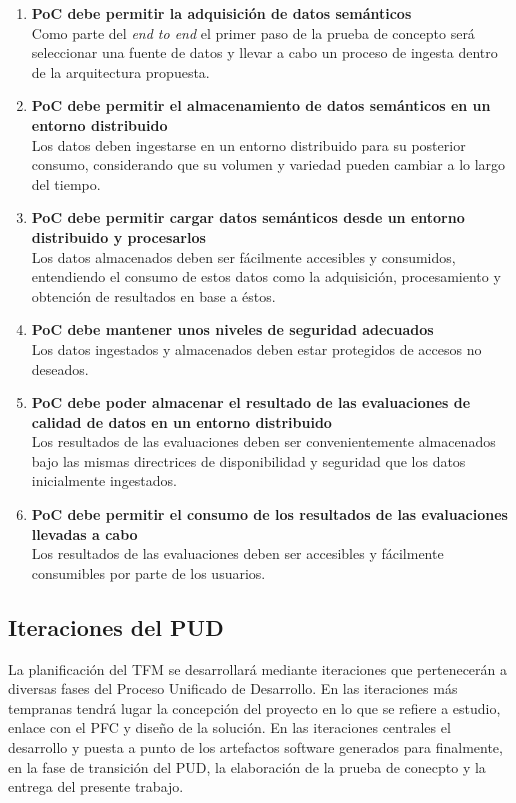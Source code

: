 \begin{enumerate}
\item \textbf{PoC debe permitir la adquisición de datos semánticos}\\Como parte
  del \textit{end to end} el primer paso de la prueba de concepto será
  seleccionar una fuente de datos y llevar a cabo un proceso de ingesta dentro
  de la arquitectura propuesta. 
  
\item \textbf{PoC debe permitir el almacenamiento de datos semánticos en un
  entorno distribuido}\\Los datos deben ingestarse en un entorno distribuido
  para su posterior consumo, considerando que su volumen y variedad pueden
  cambiar a lo largo del tiempo. 
\item \textbf{PoC debe permitir cargar datos semánticos desde un entorno
  distribuido y procesarlos}\\Los datos almacenados deben ser fácilmente
  accesibles y consumidos, entendiendo el consumo de estos datos como la
  adquisición, procesamiento y obtención de resultados en base a éstos. 
\item \textbf{PoC debe mantener unos niveles de seguridad adecuados}\\Los datos
  ingestados y almacenados deben estar protegidos de accesos no deseados. 
\item \textbf{PoC debe poder almacenar el resultado de las evaluaciones de
  calidad de datos en un entorno distribuido}\\Los resultados de las
  evaluaciones deben ser convenientemente almacenados bajo las mismas
  directrices de disponibilidad y seguridad que los datos inicialmente ingestados.
\item \textbf{PoC debe permitir el consumo de los resultados de las evaluaciones
  llevadas a cabo}\\Los resultados de las evaluaciones deben ser accesibles y
  fácilmente consumibles por parte de los usuarios. 
\end{enumerate}


\subsection{Iteraciones del \acs{PUD}}

La planificación del \acs{TFM} se desarrollará mediante iteraciones que
pertenecerán a diversas fases del Proceso Unificado de Desarrollo. En las
iteraciones más tempranas tendrá lugar la concepción del proyecto en lo que se
refiere a estudio, enlace con el \acs{PFC} y diseño de la solución. En las
iteraciones centrales el desarrollo y puesta a punto de los artefactos software
generados para finalmente, en la fase de transición del \acs{PUD}, la
elaboración de la prueba de conecpto y la entrega del presente trabajo. 



